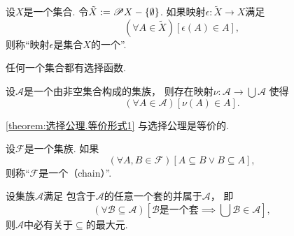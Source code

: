 \begin{definition}
设\(X\)是一个集合.
令\(\tilde{X} := \mathscr{P} X - \{\emptyset\}\).
如果映射\(\epsilon\colon \tilde{X} \to X\)满足\begin{equation*}
	(\forall A \in \tilde{X})
	[\epsilon(A) \in A],
\end{equation*}
则称“映射\(\epsilon\)是集合\(X\)的一个”.
\end{definition}

\begin{axiom}
任何一个集合都有选择函数.
\end{axiom}

\begin{theorem}\label{theorem:选择公理.等价形式1}
设\(\mathscr{A}\)是一个由非空集合构成的集族，
则存在映射\(\nu\colon \mathscr{A} \to \bigcup \mathscr{A}\)
使得\begin{equation*}
	(\forall A \in \mathscr{A})
	[\nu(A) \in A].
\end{equation*}
\end{theorem}
\cref{theorem:选择公理.等价形式1} 与选择公理是等价的.%

\begin{definition}
设\(\mathscr{F}\)是一个集族.
如果\begin{equation*}
	(\forall A,B\in\mathscr{F})
	[A \subseteq B \lor B \subseteq A],
\end{equation*}
则称“\(\mathscr{F}\)是一个（chain）”.
\end{definition}

\begin{theorem}[佐恩引理]
设集族\(\mathscr{A}\)满足
包含于\(\mathscr{A}\)的任意一个套的并属于\(\mathscr{A}\)，
即\begin{equation*}
	(\forall \mathscr{B} \subseteq \mathscr{A})
	\left[ \text{$\mathscr{B}$是一个套} \implies \bigcup \mathscr{B} \in \mathscr{A} \right],
\end{equation*}
则\(\mathscr{A}\)中必有关于\(\subseteq\)的最大元.
\end{theorem}

